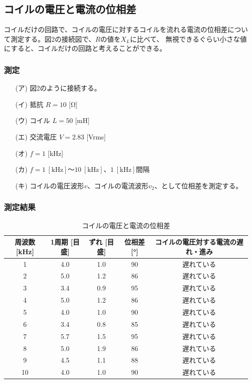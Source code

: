 \documentclass[a4paper]{jarticle}
\begin{document}
		\subsection{コイルの電圧と電流の位相差}
			コイルだけの回路で、コイルの電圧に対するコイルを流れる電流の位相差について測定する。図2の接続図で、$R$の値を$X_{L}$に比べて、
			無視できるぐらい小さな値にすると、コイルだけの回路と考えることができる。
			\subsubsection{測定}
				\begin{enumerate}
					\item[(ア)]{図2のように接続する。}
					\item[(イ)]{抵抗 $R = 10$ [Ω]}
					\item[(ウ)]{コイル $L = 50$ [mH]}
				  \item[(エ)]{交流電圧 $V = 2.83$ [Vrms]}
					\item[(オ)]{$f = 1$ [kHz]}
					\item[(カ)]{$f = 1 \ [\mathrm{kHz}] ～ 10 \ [\mathrm{kHz}]、1 \ [\mathrm{kHz}]$間隔}
					\item[(キ)]{コイルの電圧波形$v$、コイルの電流波形$v_{2}$、として位相差を測定する。}
				\end{enumerate}
			\subsubsection{測定結果}
				\begin{table}[h]
					\centering
					\small
					\caption{コイルの電圧と電流の位相差}
					\begin{tabular}{c|c|c|c|c}\hline\hline
						周波数 [kHz] & 1周期 [目盛] & ずれ [目盛] & 位相差 [°] & コイルの電圧対する電流の遅れ・進み \\ \hline
						1 & 4.0 & 1.0 & 90 & 遅れている \\
						2 & 5.0 & 1.2 & 86 & 遅れている \\
						3 & 3.4 & 0.9 & 95 & 遅れている \\
						4 & 5.0 & 1.2 & 86 & 遅れている \\
						5 & 4.0 & 1.0 & 90 & 遅れている \\
						6 & 3.4 & 0.8 & 85 & 遅れている \\
						7 & 5.7 & 1.5 & 95 & 遅れている \\
						8 & 5.0 & 1.9 & 86 & 遅れている \\
						9 & 4.5 & 1.1 & 88 & 遅れている \\
						10 & 4.0 & 1.0 & 90 & 遅れている \\ \hline
					\end{tabular}
				\end{table}
\end{document}
